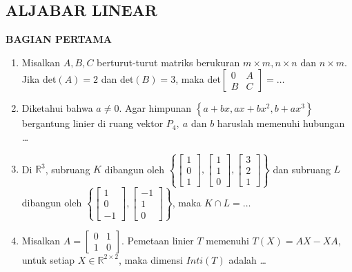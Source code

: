\documentclass[12pt,twoside]{article}
\begin{document}
\subsection{ALJABAR LINEAR}
\textbf{BAGIAN PERTAMA}
\begin{enumerate}
	\item Misalkan $A,B,C$ berturut-turut matriks berukuran $m \times m, n \times n $ dan $n \times m$. Jika det$(A)=2$ dan det$(B)=3$, maka det$\left[ \begin{array}{cc}
				      0 & A \\B&C
			      \end{array} \right] = \dots$

	\item Diketahui bahwa $a \neq 0$. Agar himpunan $\left\lbrace a+bx, ax + bx^2, b+ax^3 \right\rbrace$ bergantung linier di ruang vektor $P_4, ~a$ dan $b$ haruslah memenuhi hubungan \dots

	\item Di $\mathbb{R}^3$, subruang $K$ dibangun oleh $\left\lbrace \left[ \begin{array}{c}
				      1 \\0\\1
			      \end{array} \right],\left[ \begin{array}{c}
				      1 \\1\\0
			      \end{array} \right],\left[ \begin{array}{c}
				      3 \\2\\1
			      \end{array} \right]\right\rbrace$ dan subruang $L$ dibangun oleh $\left\lbrace \left[ \begin{array}{c}
				      1 \\0\\-1
			      \end{array} \right],\left[ \begin{array}{c}
				      -1 \\1\\0
			      \end{array} \right]\right\rbrace$, maka $K \cap L = \dots$

	\item Misalkan $A = \left[ \begin{array}{cc}
				      0 & 1 \\ 1&0
			      \end{array} \right]$. Pemetaan linier $T$ memenuhi $T(X)=AX-XA$, untuk setiap $X \in \mathbb{R}^{2 \times 2}$, maka dimensi $Inti(T)$ adalah \dots


\end{enumerate}
\end{document}
